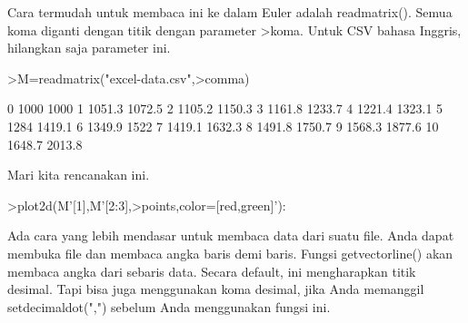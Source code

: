 \documentclass[a4paper,10pt]{article}
\begin{document}
\begin{eulernotebook}
\begin{eulercomment}
\begin{eulercomment}
\begin{eulercomment}
\begin{eulercomment}
\begin{eulercomment}
\begin{eulercomment}
\begin{eulercomment}
\begin{eulercomment}
\begin{eulercomment}
Cara termudah untuk membaca ini ke dalam Euler adalah readmatrix().
Semua koma diganti dengan titik dengan parameter \textgreater{}koma. Untuk CSV
bahasa Inggris, hilangkan saja parameter ini.
\end{eulercomment}
\begin{eulerprompt}
>M=readmatrix("excel-data.csv",>comma)
\end{eulerprompt}
\begin{euleroutput}
          0      1000      1000 
          1    1051.3    1072.5 
          2    1105.2    1150.3 
          3    1161.8    1233.7 
          4    1221.4    1323.1 
          5      1284    1419.1 
          6    1349.9      1522 
          7    1419.1    1632.3 
          8    1491.8    1750.7 
          9    1568.3    1877.6 
         10    1648.7    2013.8 
\end{euleroutput}
\begin{eulercomment}
Mari kita rencanakan ini.
\end{eulercomment}
\begin{eulerprompt}
>plot2d(M'[1],M'[2:3],>points,color=[red,green]'):
\end{eulerprompt}
\begin{eulercomment}
Ada cara yang lebih mendasar untuk membaca data dari suatu file. Anda
dapat membuka file dan membaca angka baris demi baris. Fungsi
getvectorline() akan membaca angka dari sebaris data. Secara default,
ini mengharapkan titik desimal. Tapi bisa juga menggunakan koma
desimal, jika Anda memanggil setdecimaldot(",") sebelum Anda
menggunakan fungsi ini.


\end{eulercomment}
\end{eulercomment}
\end{eulercomment}
\end{eulercomment}
\end{eulercomment}
\end{eulercomment}
\end{eulercomment}
\end{eulercomment}
\end{eulercomment}
\end{eulernotebook}
\end{document}
